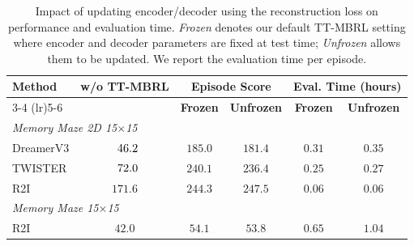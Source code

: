 \begin{table}[ht]
    \caption{Impact of updating encoder/decoder using the reconstruction loss on performance and evaluation time. \textit{Frozen} denotes our default TT-MBRL setting where encoder and decoder parameters are fixed at test time; \textit{Unfrozen} allows them to be updated. We report the evaluation time per episode.}
    \centering
    \setlength{\tabcolsep}{11pt}
    \begin{tabular}{lccccc}
    \toprule
    \textbf{Method} & \textbf{w/o TT-MBRL} & \multicolumn{2}{c}{\textbf{Episode Score}} 
      & \multicolumn{2}{c}{\textbf{Eval. Time (hours)}} \\
    \cmidrule(lr){3-4} \cmidrule(lr){5-6}
    & & \textbf{Frozen} & \textbf{Unfrozen} & \textbf{Frozen} & \textbf{Unfrozen} \\
    \midrule
    \multicolumn{6}{l}{\textit{Memory Maze 2D 15$\times$15}}\\ 
    DreamerV3 & $\hphantom{0}46.2$ & $\mathbf{185.0}$ & $181.4$ & $\mathbf{0.31}$ & $0.35$ \\
    TWISTER   & $\hphantom{0}72.0$ & $240.1$ & $236.4$ & $\mathbf{0.25}$ & $0.27$ \\
    R2I       & $171.6$ & $244.3$ & $\mathbf{247.5}$ & $\mathbf{0.06}$ & $0.06$ \\
    \midrule
    \multicolumn{6}{l}{\textit{Memory Maze 15$\times$15}}\\ 
    R2I       & $42.0$ & $\mathbf{54.1}$ & $53.8$ & $\mathbf{0.65}$ & $1.04$ \\
    \bottomrule
    \end{tabular}
    \label{table:freezing}
\end{table}